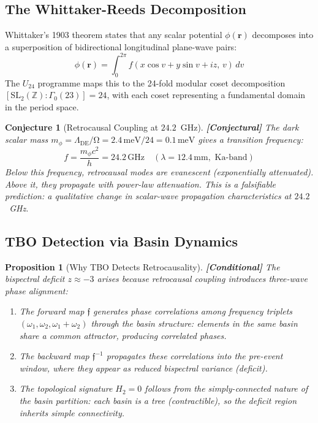 \documentclass[12pt,a4paper]{article}
\newcommand{\conditional}[1]{\textcolor{conditional}{\textbf{[Conditional]}} #1}
\newcommand{\conjectural}[1]{\textcolor{conjectural}{\textbf{[Conjectural]}} #1}
\newtheorem{proposition}[theorem]{Proposition}
\newtheorem{conjecture}[theorem]{Conjecture}
\theoremstyle{definition}
\theoremstyle{remark}
\renewcommand{\O}{\mathrm{\Omega}}
\newcommand{\Reeds}{\mathfrak{f}}
\begin{document}
\subsection{The Whittaker-Reeds Decomposition}

Whittaker's 1903 theorem \cite{whittaker1903} states that any scalar potential
$\phi(\mathbf{r})$ decomposes into a superposition of bidirectional longitudinal
plane-wave pairs:
\begin{equation}
  \phi(\mathbf{r}) = \int_0^{2\pi} f(x \cos v + y \sin v + iz, \, v) \, dv
\end{equation}
The $U_{24}$ programme maps this to the 24-fold modular coset decomposition
$[\mathrm{SL}_2(\mathbb{Z}) : \Gamma_0(23)] = 24$, with each coset representing
a fundamental domain in the period space.

\begin{conjecture}[Retrocausal Coupling at $24.2$~GHz]
\label{conj:frequency}
\conjectural{The dark scalar mass $m_\phi = \Lambda_{\mathrm{DE}}/\O = 2.4\,\mathrm{meV}/24 = 0.1\,\mathrm{meV}$ gives a transition frequency:}
\begin{equation}
  f = \frac{m_\phi c^2}{h} = 24.2\,\mathrm{GHz} \quad (\lambda = 12.4\,\mathrm{mm}, \text{ Ka-band})
\end{equation}
Below this frequency, retrocausal modes are evanescent (exponentially
attenuated). Above it, they propagate with power-law attenuation. This
is a falsifiable prediction: a qualitative change in scalar-wave
propagation characteristics at $24.2$~GHz.
\end{conjecture}

\subsection{TBO Detection via Basin Dynamics}

\begin{proposition}[Why TBO Detects Retrocausality]
\label{prop:tbo_mechanism}
\conditional{The bispectral deficit $z \approx -3$ arises because retrocausal
coupling introduces three-wave phase alignment:}
\begin{enumerate}
  \item The forward map $\Reeds$ generates phase correlations among frequency
  triplets $(\omega_1, \omega_2, \omega_1 + \omega_2)$ through the basin
  structure: elements in the same basin share a common attractor, producing
  correlated phases.
  \item The backward map $\Reeds^{-1}$ propagates these correlations into the
  pre-event window, where they appear as reduced bispectral variance (deficit).
  \item The topological signature $H_2 = 0$ follows from the simply-connected
  nature of the basin partition: each basin is a tree (contractible), so the
  deficit region inherits simple connectivity.
\end{enumerate}
\end{proposition}
\end{document}
